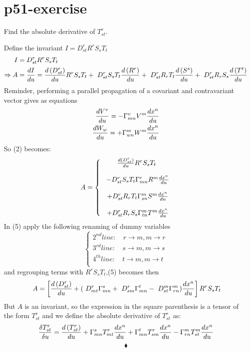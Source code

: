 \section{p51-exercise}
\begin{tcolorbox}
Find the absolute derivative of $T^r_{st}$.
\end{tcolorbox}
Define the invariant $ I = D^r_{st}R^rS_sT_t$ 
\begin{align}
\ I &= D^r_{st}R^rS_sT_t\\
\Rightarrow A &= \dv{I}{u}= 
\dv{\left(D^r_{st}\right)}{u}R^rS_sT_t+
\ D^r_{st}S_sT_t\dv{\left(R^r\right)}{u}+
\ D^r_{st}R_rT_t\dv{\left(S^s\right)}{u}+
\ D^r_{st}R_rS_s\dv{\left(T^t\right)}{u}
\end{align} 
Reminder, performing a parallel propagation of a covariant and contravariant vector gives as equations
\begin{align}
\dv{V^v}{u} = - \Gamma^v_{mn}V^m\dv{x^n}{u}\\
\dv{W_w}{u} = + \Gamma^m_{wn}W^m\dv{x^n}{u}
\end{align}
So (2) becomes:
\begin{align}
\ A = \left\{ \begin{array}{c}
\dv{\left(D^r_{st}\right)}{u}R^rS_sT_t\\\\
\ -D^r_{st}S_sT_t\Gamma^r_{mn}R^m\dv{x^n}{u}\\\\
\ +D^r_{st}R_rT_t \Gamma^m_{sn}S^m\dv{x^n}{u}\\\\
\ +D^r_{st}R_rS_s\Gamma^m_{tn}T^m\dv{x^n}{u}
\end{array} \right.
\end{align}
In (5) apply the following renaming of dummy variables 
$$\left\{\begin{array}{c}
2^{nd} line: \quad r\rightarrow m, m \rightarrow r\\
3^{rd} line: \quad s\rightarrow m, m \rightarrow s\\
4^{th} line: \quad t\rightarrow m, m \rightarrow t\\
\end{array}  \right. $$
and regrouping terms with $R^rS_sT_t$,(5) becomes then
\begin{align}
\ A = \left[\dv{\left(D^r_{st}\right)}{u}+(\ D^r_{mt}\Gamma^s_{mn}+\ D^r_{sm}\Gamma^t_{mn}-\ D^m_{st}\Gamma^m_{rn})\dv{x^n}{u}\right]R^rS_sT_t
\end{align}
But $A$ is an invariant, so the expression in the square parenthesis is a tensor of the form $T^r_{st}$ and we define the absolute derivative of $T^r_{st}$ as:
$$ \frac{\delta T^r_{st}}{\delta u} = \dv{\left(T^r_{st}\right)}{u}+\Gamma^s_{mn} T^r_{mt}\dv{x^n}{u}+\Gamma^t_{mn}T^r_{sm}\dv{x^n}{u}-\Gamma^m_{rn} T^m_{st}\dv{x^n}{u}$$
$$\blacklozenge$$
\newpage

